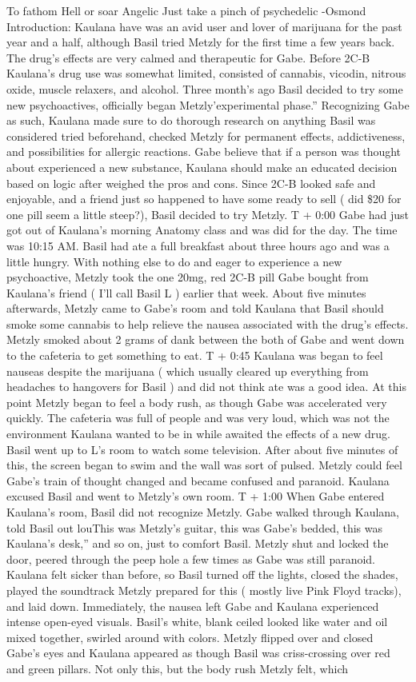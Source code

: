 \documentclass[12pt]{book}
\begin{document}
To fathom Hell or soar Angelic Just take a pinch of psychedelic -Osmond Introduction: Kaulana have was an avid user and lover of marijuana for the past year and a half, although Basil tried Metzly for the first time a few years back. The drug's effects are very calmed and therapeutic for Gabe. Before 2C-B Kaulana's drug use was somewhat limited, consisted of cannabis, vicodin, nitrous oxide, muscle relaxers, and alcohol. Three month's ago Basil decided to try some new psychoactives, officially began Metzly'experimental phase.'' Recognizing Gabe as such, Kaulana made sure to do thorough research on anything Basil was considered tried beforehand, checked Metzly for permanent effects, addictiveness, and possibilities for allergic reactions. Gabe believe that if a person was thought about experienced a new substance, Kaulana should make an educated decision based on logic after weighed the pros and cons. Since 2C-B looked safe and enjoyable, and a friend just so happened to have some ready to sell ( did \$20 for one pill seem a little steep?), Basil decided to try Metzly. T + 0:00 Gabe had just got out of Kaulana's morning Anatomy class and was did for the day. The time was 10:15 AM. Basil had ate a full breakfast about three hours ago and was a little hungry. With nothing else to do and eager to experience a new psychoactive, Metzly took the one 20mg, red 2C-B pill Gabe bought from Kaulana's friend ( I'll call Basil L ) earlier that week. About five minutes afterwards, Metzly came to Gabe's room and told Kaulana that Basil should smoke some cannabis to help relieve the nausea associated with the drug's effects. Metzly smoked about 2 grams of dank between the both of Gabe and went down to the cafeteria to get something to eat. T + 0:45 Kaulana was began to feel nauseas despite the marijuana ( which usually cleared up everything from headaches to hangovers for Basil ) and did not think ate was a good idea. At this point Metzly began to feel a body rush, as though Gabe was accelerated very quickly. The cafeteria was full of people and was very loud, which was not the environment Kaulana wanted to be in while awaited the effects of a new drug. Basil went up to L's room to watch some television. After about five minutes of this, the screen began to swim and the wall was sort of pulsed. Metzly could feel Gabe's train of thought changed and became confused and paranoid. Kaulana excused Basil and went to Metzly's own room. T + 1:00 When Gabe entered Kaulana's room, Basil did not recognize Metzly. Gabe walked through Kaulana, told Basil out louThis was Metzly's guitar, this was Gabe's bedded, this was Kaulana's desk,'' and so on, just to comfort Basil. Metzly shut and locked the door, peered through the peep hole a few times as Gabe was still paranoid. Kaulana felt sicker than before, so Basil turned off the lights, closed the shades, played the soundtrack Metzly prepared for this ( mostly live Pink Floyd tracks), and laid down. Immediately, the nausea left Gabe and Kaulana experienced intense open-eyed visuals. Basil's white, blank ceiled looked like water and oil mixed together, swirled around with colors. Metzly flipped over and closed Gabe's eyes and Kaulana appeared as though Basil was criss-crossing over red and green pillars. Not only this, but the body rush Metzly felt, which 
\end{document}
